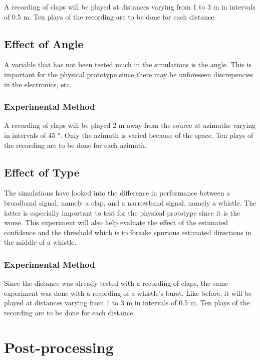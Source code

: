 \documentclass[notitlepage]{report}
\begin{document}
A recording of claps will be played at distances varying from 1 to 3 \si{m} in intervals of 0.5 \si{m}. Ten plays of the recording are to be done for each distance.

\section{Effect of Angle}

A variable that has not been tested much in the simulations is the angle. This is important for the physical prototype since there may be unforeseen discrepencies in the electronics, etc.

\subsection{Experimental Method}

A recording of claps will be played 2 \si{m} away from the source at azimuths varying in intervals of 45 \si{\degree}. Only the azimuth is varied because of the space. Ten plays of the recording are to be done for each azimuth.

\section{Effect of Type}

The simulations have looked into the difference in performance between a broadband signal, namely a clap, and a narrowband signal, namely a whistle. The latter is especially important to test for the physical prototype since it is the worse. This experiment will also help evaluate the effect of the estimated confidence and the threshold which is to forsake spurious estimated directions in the middle of a whistle.

\subsection{Experimental Method}

Since the distance was already tested with a recording of claps, the same experiment was done with a recording of a whistle's burst. Like before, it will be played at distances varying from 1 to 3 \si{m} in intervals of 0.5 \si{m}. Ten plays of the recording are to be done for each distance.

\chapter{Post-processing}
\end{document}
